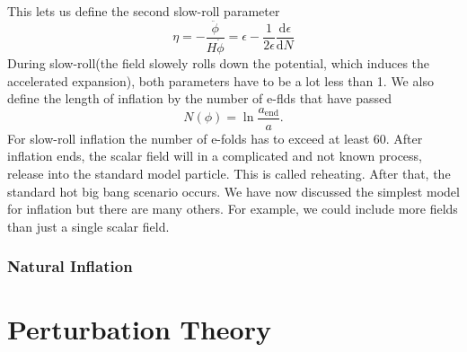 \documentclass[12pt]{article}
\begin{document}
This lets us define the second slow-roll parameter 
\begin{equation}
    \eta = -\frac{\ddot{\phi}}{H \dot{\phi}} = \epsilon - \frac{1}{2\epsilon} \frac{\mathrm{d}\epsilon}{\mathrm{d}N}
\end{equation}
During slow-roll(the field slowely rolls down the potential, which induces the accelerated expansion), both parameters have to be a lot less than 1. We also define the length of inflation by the number of e-flds that have passed
\begin{equation}
    N(\phi) = \ln\frac{a_{\mathrm{end}}}{a}.
\end{equation}
For slow-roll inflation the number of e-folds has to exceed at least 60. After inflation ends, the scalar field will in a complicated and not known process, release into the standard model particle. This is called reheating. After that, the standard hot big bang scenario occurs. We have now discussed the simplest model for inflation but there are many others. For example, we could include more fields than just a single scalar field. 

\subsubsection{Natural Inflation}

\section{Perturbation Theory}
\end{document}
